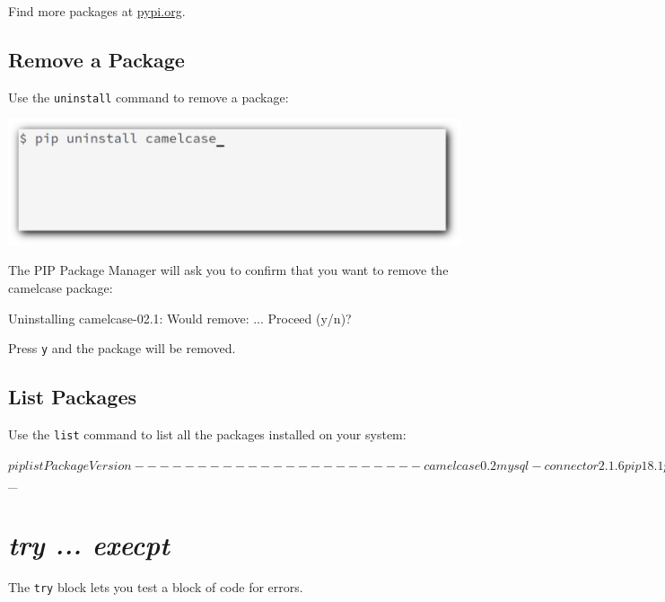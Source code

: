 \documentclass[12pt,a4paper]{article}
\newcommand{\code}[1]{%
	\colorbox{backcolour}{\lstinline{#1}}%
}
\newcommand{\lcode}[1]{%
	\lstinline{#1}%
}
\begin{document}
Find more packages at \underline{\href{https://pypi.org/}{pypi.org}}.
\subsection{Remove a Package}

Use the \code{uninstall} command to remove a package:

\begin{center}
	\includegraphics[width=.7\textwidth]{shots/pip-uninstall-package.png}
\end{center}

The PIP Package Manager will ask you to confirm that you want to remove the
camelcase package:

\begin{bbox}
\begin{vercode}
Uninstalling camelcase-02.1:
	Would remove:
		...
Proceed (y/n)?
\end{vercode}
\end{bbox}

Press \lcode{y} and the package will be removed.
\subsection{List Packages}

Use the \texttt{list} command to list all the packages installed on your system:

\begin{bbox}
	\begin{vercode}
$ pip list
Package         Version
-----------------------
camelcase       0.2
mysql-connector 2.1.6
pip             18.1
pymongo         3.6.1
setuptools      39.0.1
$_
	\end{vercode}
\end{bbox}
\vfill\newpage
\section{\textit{try ... execpt}}\label{pyTryStatement}

The \code{try} block lets you test a block of code for errors.
\end{document}
